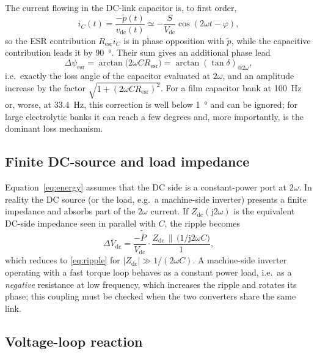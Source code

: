 \documentclass[11pt,a4paper]{article}
\begin{document}
The current flowing in the DC-link capacitor is, to first order,
\begin{equation}
  i_C(t) = \frac{-\tilde p(t)}{v_{\mathrm{dc}}(t)}
         \simeq -\frac{S}{V_{\mathrm{dc}}}\cos(2\omega t - \varphi),
\end{equation}
so the ESR contribution $R_{\mathrm{esr}} i_C$ is in phase opposition with
$\tilde p$, while the capacitive contribution leads it by \SI{90}{\degree}.
Their sum gives an additional phase lead
\begin{equation}
  \Delta\psi_{\mathrm{esr}} = \arctan\!\bigl(2\omega C R_{\mathrm{esr}}\bigr)
  = \arctan\!\left(\tan\delta\right)_{@2\omega},
\end{equation}
i.e.\ exactly the loss angle of the capacitor evaluated at $2\omega$, and an
amplitude increase by the factor $\sqrt{1+(2\omega C R_{\mathrm{esr}})^2}$. For
a film capacitor bank at \SI{100}{\hertz} or, worse, at \SI{33.4}{\hertz}, this
correction is well below \SI{1}{\degree} and can be ignored; for large
electrolytic banks it can reach a few degrees and, more importantly, is the
dominant loss mechanism.

\subsection{Finite DC-source and load impedance}

Equation~\eqref{eq:energy} assumes that the DC side is a constant-power port at
$2\omega$. In reality the DC source (or the load, e.g.\ a machine-side inverter)
presents a finite impedance and absorbs part of the $2\omega$ current. If
$Z_{\mathrm{dc}}(\mathrm j 2\omega)$ is the equivalent DC-side impedance seen in
parallel with $C$, the ripple becomes
\begin{equation}
  \Delta \bar V_{\mathrm{dc}} =
  \frac{-\tilde{\bar P}}{V_{\mathrm{dc}}}\cdot
  \frac{Z_{\mathrm{dc}} \,\|\, \bigl(1/\mathrm j 2\omega C\bigr)}{1},
\end{equation}
which reduces to \eqref{eq:ripple} for $|Z_{\mathrm{dc}}| \gg 1/(2\omega C)$.
A machine-side inverter operating with a fast torque loop behaves as a constant
power load, i.e.\ as a \emph{negative} resistance at low frequency, which
increases the ripple and rotates its phase; this coupling must be checked when
the two converters share the same link.

\subsection{Voltage-loop reaction}
\end{document}
